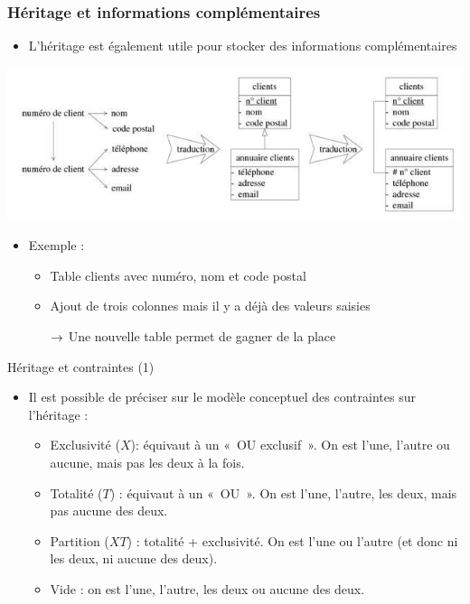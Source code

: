 \begin{frame}
  \frametitle{Héritage et informations complémentaires}
  \begin{itemize}
    \item L'héritage est également utile pour stocker des informations complémentaires
  \end{itemize}
  \begin{center}
    \includegraphics[width=0.9\linewidth]{heritage_informations_complementaires.jpg}
  \end{center}
  \begin{itemize}
    \item Exemple :
      \begin{itemize}
        \item Table clients avec numéro, nom et code postal
        \item Ajout de trois colonnes mais il y a déjà des valeurs saisies
        \item[$\rightarrow$] Une nouvelle table permet de gagner de la place
      \end{itemize}
  \end{itemize}
\end{frame}

\begin{framentitle}{Héritage et contraintes (1)}
    \begin{itemize}
       \item Il est possible de préciser sur le modèle conceptuel des
            contraintes sur l'héritage :
            \begin{itemize}
                \item Exclusivité ($X$): équivaut à un «~OU exclusif~». On est l'une,
                    l'autre ou aucune, mais pas les deux à la fois.
                \item Totalité ($T$) : équivaut à un «~OU~». On est l'une,
                    l'autre, les deux, mais pas aucune des deux.
                \item Partition ($XT$) : totalité + exclusivité. On est l'une ou
                    l'autre (et donc ni les deux, ni aucune des deux).
                \item Vide : on est l'une, l'autre, les deux ou aucune des deux.
            \end{itemize}
    \end{itemize}
\end{framentitle}


